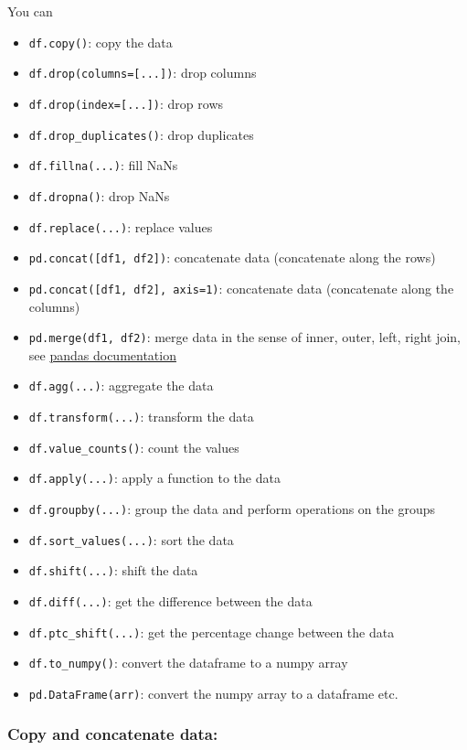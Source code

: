 \documentclass[
  letterpaper,
  DIV=11,
  numbers=noendperiod]{scrreprt}
\providecommand{\tightlist}{%
  \setlength{\itemsep}{0pt}\setlength{\parskip}{0pt}}\usepackage{longtable,booktabs,array}
\begin{document}
You can

\begin{itemize}
\tightlist
\item
  \texttt{df.copy()}: copy the data
\item
  \texttt{df.drop(columns={[}...{]})}: drop columns
\item
  \texttt{df.drop(index={[}...{]})}: drop rows
\item
  \texttt{df.drop\_duplicates()}: drop duplicates
\item
  \texttt{df.fillna(...)}: fill NaNs
\item
  \texttt{df.dropna()}: drop NaNs
\item
  \texttt{df.replace(...)}: replace values
\item
  \texttt{pd.concat({[}df1,\ df2{]})}: concatenate data (concatenate
  along the rows)
\item
  \texttt{pd.concat({[}df1,\ df2{]},\ axis=1)}: concatenate data
  (concatenate along the columns)
\item
  \texttt{pd.merge(df1,\ df2)}: merge data in the sense of inner, outer,
  left, right join, see
  \href{https://pandas.pydata.org/pandas-docs/stable/reference/api/pandas.DataFrame.merge.html}{pandas
  documentation}
\item
  \texttt{df.agg(...)}: aggregate the data
\item
  \texttt{df.transform(...)}: transform the data
\item
  \texttt{df.value\_counts()}: count the values
\item
  \texttt{df.apply(...)}: apply a function to the data
\item
  \texttt{df.groupby(...)}: group the data and perform operations on the
  groups
\item
  \texttt{df.sort\_values(...)}: sort the data
\item
  \texttt{df.shift(...)}: shift the data
\item
  \texttt{df.diff(...)}: get the difference between the data
\item
  \texttt{df.ptc\_shift(...)}: get the percentage change between the
  data
\item
  \texttt{df.to\_numpy()}: convert the dataframe to a numpy array
\item
  \texttt{pd.DataFrame(arr)}: convert the numpy array to a dataframe
  etc.
\end{itemize}

\subsubsection*{Copy and concatenate
data:}\label{copy-and-concatenate-data}
\end{document}
